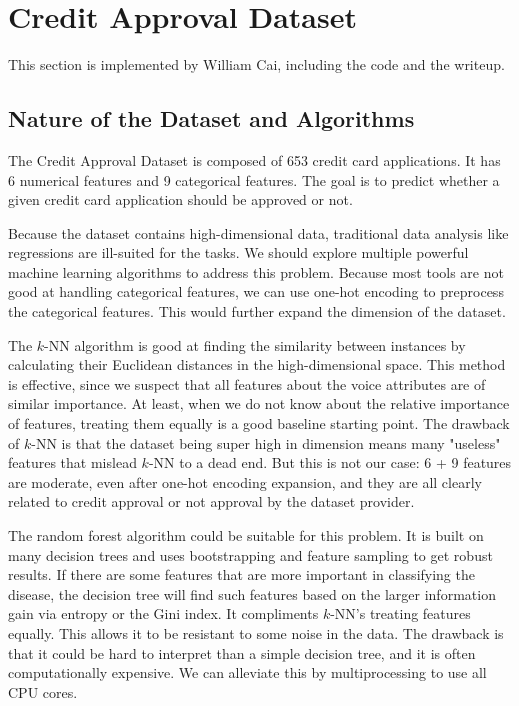 \section{Credit Approval Dataset}

This section is implemented by William Cai, including the code and the writeup. 

\subsection{Nature of the Dataset and Algorithms}

The Credit Approval Dataset is composed of 653 credit card applications. It has 6 numerical features and 9 categorical features. The goal is to predict whether a given credit card application should be approved or not.  

Because the dataset contains high-dimensional data, traditional data analysis like regressions are ill-suited for the tasks. We should explore multiple powerful machine learning algorithms to address this problem. Because most tools are not good at handling categorical features, we can use one-hot encoding to preprocess the categorical features. This would further expand the dimension of the dataset. 

The $k$-NN algorithm is good at finding the similarity between instances by calculating their Euclidean distances in the high-dimensional space. This method is effective, since we suspect that all features about the voice attributes are of similar importance. At least, when we do not know about the relative importance of features, treating them equally is a good baseline starting point. The drawback of $k$-NN is that the dataset being super high in dimension means many "useless" features that mislead $k$-NN to a dead end. But this is not our case: 6 + 9 features are moderate, even after one-hot encoding expansion, and they are all clearly related to credit approval or not approval by the dataset provider. 

The random forest algorithm could be suitable for this problem. It is built on many decision trees and uses bootstrapping and feature sampling to get robust results. If there are some features that are more important in classifying the disease, the decision tree will find such features based on the larger information gain via entropy or the Gini index. It compliments $k$-NN's treating features equally. This allows it to be resistant to some noise in the data. The drawback is that it could be hard to interpret than a simple decision tree, and it is often computationally expensive. We can alleviate this by multiprocessing to use all CPU cores.

